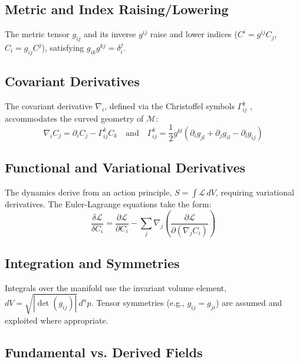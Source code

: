 \subsection{Metric and Index Raising/Lowering}

The metric tensor \(g_{ij}\) and its inverse \(g^{ij}\) raise and lower indices (\(C^i = g^{ij} C_j\), \(C_i = g_{ij} C^j\)), satisfying \(g_{ik} g^{kj} = \delta_i^j\).

\subsection{Covariant Derivatives}

The covariant derivative \(\nabla_i\), defined via the Christoffel symbols \(\Gamma^k_{ij}\) \autocite{Christoffel1869}, accommodates the curved geometry of \(\mathcal{M}\):
\begin{equation}
\nabla_i C_j = \partial_i C_j - \Gamma^k_{ij} C_k \quad \text{and} \quad \Gamma^k_{ij} = \frac{1}{2} g^{kl} ( \partial_i g_{jl} + \partial_j g_{il} - \partial_l g_{ij} )
\end{equation}

\subsection{Functional and Variational Derivatives}

The dynamics derive from an action principle, \(S = \int \mathcal{L} \, dV\), requiring variational derivatives. The Euler-Lagrange equations take the form:
\begin{equation}
\frac{\delta \mathcal{L}}{\delta C_i} = \frac{\partial \mathcal{L}}{\partial C_i} - \sum_j \nabla_j \left( \frac{\partial \mathcal{L}}{\partial (\nabla_j C_i)} \right)
\end{equation}

\subsection{Integration and Symmetries}

Integrals over the manifold use the invariant volume element, \(dV = \sqrt{|\det(g_{ij})|} \, d^n p\). Tensor symmetries (e.g., \(g_{ij} = g_{ji}\)) are assumed and exploited where appropriate.

\subsection{Fundamental vs. Derived Fields}

